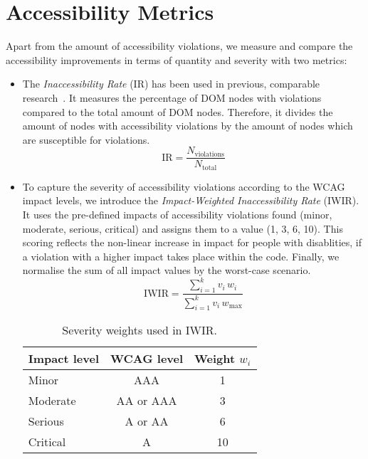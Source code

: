 \section{Accessibility Metrics}
Apart from the amount of accessibility violations, we measure and compare the 
accessibility improvements in terms of 
quantity and severity with two metrics:
\begin{itemize}
  \item The \textit{Inaccessibility Rate} (IR) has been used in previous, comparable
research~\parencite{alshayban2020accessibility}. It measures the 
percentage of DOM nodes with violations compared to the total amount of DOM nodes.
Therefore, it divides the amount of nodes with accessibility 
violations by the amount of nodes which are susceptible for violations.\newline
\begin{equation}
    \mathrm{IR} = \frac{N_{\mathrm{violations}}}{N_{\mathrm{total}}}
\end{equation}
\item To capture the severity of accessibility violations according to the WCAG impact levels,
we introduce the \textit{Impact-Weighted Inaccessibility Rate} (IWIR). It 
uses the pre-defined impacts of accessibility violations found 
(minor, moderate, serious, critical)
and assigns them to a value (1, 3, 6, 10). This scoring reflects the non-linear 
increase in impact for people with disablities, if a violation with a higher 
impact takes place within the code. Finally, we normalise the sum of all 
impact values by the worst-case scenario.\newline
\begin{equation}
  \mathrm{IWIR} = 
    \frac{\displaystyle\sum_{i=1}^{k} v_i \, w_i}
         {\displaystyle\sum_{i=1}^{k} v_i \, w_{\mathrm{max}}}
  \label{eq:iwir}
\end{equation}


\begin{table}[ht]
\centering
\caption{Severity weights used in IWIR.}
  \label{tab:weights}
  \begin{tabular}{lcc}
  \toprule
  Impact level & WCAG level & Weight $w_i$ \\
  \midrule
  Minor    & AAA          & 1  \\
  Moderate & AA or AAA    & 3  \\
  Serious  & A or AA      & 6  \\
  Critical & A          & 10 \\
  \bottomrule
  \end{tabular}
\end{table}

\end{itemize}

